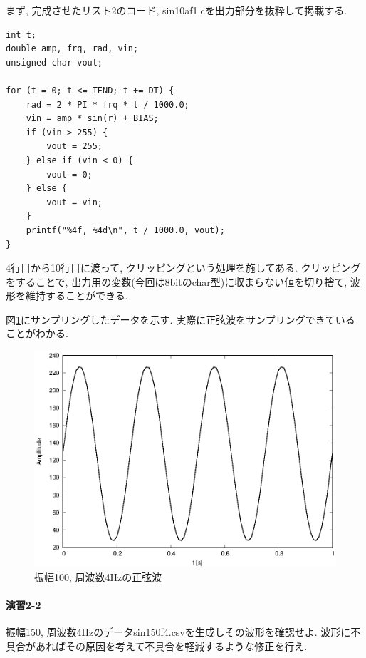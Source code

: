 \documentclass[titlepage]{jsarticle}
\begin{document}
        まず, 完成させたリスト2のコード, sin10af1.cを出力部分を抜粋して掲載する.

        \begin{lstlisting}[caption=sin10af1.c, label=src:sin10af1]
int t;
double amp, frq, rad, vin;
unsigned char vout;

for (t = 0; t <= TEND; t += DT) {
    rad = 2 * PI * frq * t / 1000.0;
    vin = amp * sin(r) + BIAS;
    if (vin > 255) {
        vout = 255;
    } else if (vin < 0) {
        vout = 0;
    } else {
        vout = vin;
    }
    printf("%4f, %4d\n", t / 1000.0, vout);
}
        \end{lstlisting}

        4行目から10行目に渡って, クリッピングという処理を施してある.
        クリッピングをすることで, 出力用の変数(今回は8bitのchar型)に収まらない値を切り捨て,
        波形を維持することができる.

        図\ref{fig:sin100f4}にサンプリングしたデータを示す.
        実際に正弦波をサンプリングできていることがわかる.

        \begin{figure}[ht]
            \centering
            \includegraphics[width=12cm]{images/sin100f4.eps}
            \caption{振幅100, 周波数4Hzの正弦波}
            \label{fig:sin100f4}
        \end{figure}

    \paragraph{演習2-2} 振幅150, 周波数4Hzのデータsin150f4.csvを生成しその波形を確認せよ.
    波形に不具合があればその原因を考えて不具合を軽減するような修正を行え.
        
\end{document}
